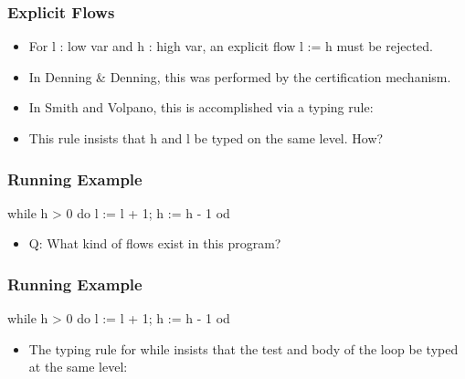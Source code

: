 \documentclass{beamer}
\begin{document}
\begin{frame}[fragile]
\frametitle{Explicit Flows}

\begin{itemize}
\item For \<l : low var\> and \<h : high var\>,
      an explicit flow \<l := h\> must be rejected.
\pause
\item In Denning \& Denning, this was performed by the certification mechanism.
\pause
\item In Smith and Volpano, this is accomplished via a typing rule:
\begin{haskell}
\end{haskell} 
\pause 
\item This rule insists that \<h\> and \<l\> be typed on the same level. How?
\end{itemize}

\end{frame}
\begin{frame}[fragile]
\frametitle{Running Example}

\begin{center}
\begin{normalcode}
            while h > 0 do
               l := l + 1;
               h := h - 1
            od 
\end{normalcode}
\end{center}
\pause
\begin{itemize}
\item Q: What kind of flows exist in this program?
\end{itemize}

\end{frame}

\begin{frame}[fragile]
\frametitle{Running Example}

\begin{center}
\begin{normalcode}
            while h > 0 do
               l := l + 1;
               h := h - 1
            od 
\end{normalcode}
\end{center}
\pause
\begin{itemize}
\item The typing rule for \<while\> insists that the test and body of the loop be typed at the same level:
\begin{haskell}
\end{haskell}
\end{itemize}

\end{frame}
\end{document}
